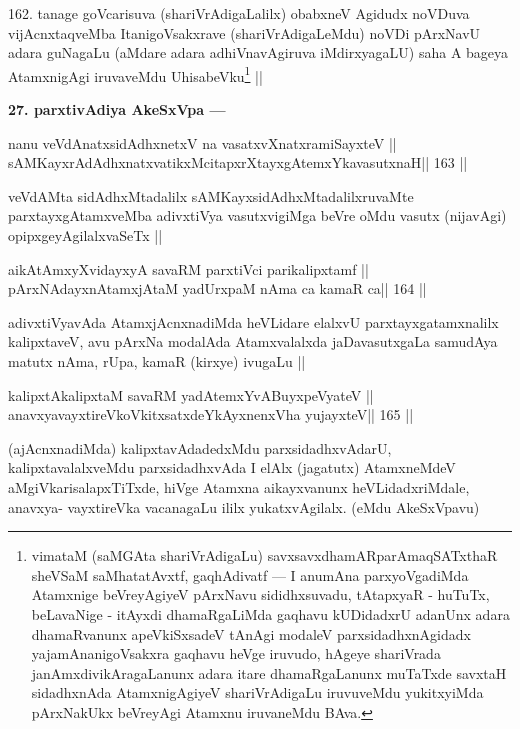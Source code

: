 \begin{artha}
162. tanage goVcarisuva (shariVrAdigaLalilx) obabxneV Agidudx noVDuva vijAcnxtaqveMba ItanigoVsakxrave (shariVrAdigaLeMdu) noVDi pArxNavU adara guNagaLu (aMdare adara adhiVnavAgiruva iMdirxyagaLU) saha A bageya AtamxnigAgi iruvaveMdu UhisabeVku\footnote[9]{vimataM (saMGAta shariVrAdigaLu) savxsavxdhamARparAmaqSATxthaR sheVSaM saMhatatAvxtf, gaqhAdivatf --- I anumAna parxyoVgadiMda Atamxnige beVreyAgiyeV pArxNavu sididhxsuvadu, tAtapxyaR - huTuTx, beLavaNige - itAyxdi dhamaRgaLiMda gaqhavu kUDidadxrU adanUnx adara dhamaRvanunx apeVkiSxsadeV tAnAgi modaleV parxsidadhxnAgidadx yajamAnanigoVsakxra gaqhavu heVge iruvudo, hAgeye shariVrada janAmxdivikAragaLanunx adara itare dhamaRgaLanunx muTaTxde savxtaH sidadhxnAda AtamxnigAgiyeV shariVrAdigaLu iruvuveMdu yukitxyiMda pArxNakUkx beVreyAgi Atamxnu iruvaneMdu BAva.} ||
\end{artha}

\begin{artha}
{\bf 27. parxtivAdiya AkeSxVpa ---}
\end{artha}

\begin{shl}
nanu veVdAnatxsidAdhxnetxV na vasatxvXnatxramiSayxteV ||
sAMKayxrAdAdhxnatxvatikxMcitapxrXtayxgAtemxYkavasutxnaH\hfill || 163 ||
\end{shl}

\begin{artha}
veVdAMta sidAdhxMtadalilx sAMKayxsidAdhxMtadalilxruvaMte parxtayxgAtamxveMba adivxtiVya vasutxvigiMga beVre oMdu vasutx (nijavAgi) opipxgeyAgilalxvaSeTx ||
\end{artha}

\begin{shl}
aikAtAmxyXvidayxyA savaRM parxtiVci parikalipxtamf ||
pArxNAdayxnAtamxjAtaM yadUrxpaM nAma ca kamaR ca\hfill || 164 ||
\end{shl}

\begin{artha}
adivxtiVyavAda AtamxjAcnxnadiMda heVLidare elalxvU parxtayxgatamxnalilx kalipxtaveV, avu pArxNa modalAda Atamxvalalxda jaDavasutxgaLa samudAya matutx nAma, rUpa, kamaR (kirxye) ivugaLu ||
\end{artha}

\begin{shl}
kalipxtAkalipxtaM savaRM yadA\s\s temxYvABuyxpeVyateV ||
anavxyavayxtireVkoVkitxsatxdeYkAyxnenxVha yujayxteV\hfill || 165 ||
\end{shl}

\begin{artha}
(ajAcnxnadiMda) kalipxtavAdadedxMdu parxsidadhxvAdarU, kalipxtavalalxveMdu parxsidadhxvAda I elAlx (jagatutx) AtamxneMdeV aMgiVkarisalapxTiTxde, hiVge Atamxna aikayxvanunx heVLidadxriMdale, anavxya- vayxtireVka vacanagaLu ililx yukatxvAgilalx. (eMdu AkeSxVpavu)
\end{artha}

